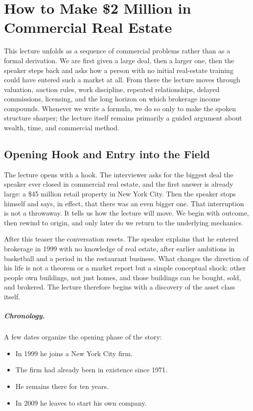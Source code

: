 \chapter{How to Make \$2 Million in Commercial Real Estate}

This lecture unfolds as a sequence of commercial problems rather than as a formal derivation. We are first given a large deal, then a larger one, then the speaker steps back and asks how a person with no initial real-estate training could have entered such a market at all. From there the lecture moves through valuation, auction rules, work discipline, repeated relationships, delayed commissions, licensing, and the long horizon on which brokerage income compounds. Whenever we write a formula, we do so only to make the spoken structure sharper; the lecture itself remains primarily a guided argument about wealth, time, and commercial method.

\section{Opening Hook and Entry into the Field}

The lecture opens with a hook. The interviewer asks for the biggest deal the speaker ever closed in commercial real estate, and the first answer is already large: a \$45 million retail property in New York City. Then the speaker stops himself and says, in effect, that there was an even bigger one. That interruption is not a throwaway. It tells us how the lecture will move. We begin with outcome, then rewind to origin, and only later do we return to the underlying mechanics.

After this teaser the conversation resets. The speaker explains that he entered brokerage in 1999 with no knowledge of real estate, after earlier ambitions in basketball and a period in the restaurant business. What changes the direction of his life is not a theorem or a market report but a simple conceptual shock: other people own buildings, not just homes, and those buildings can be bought, sold, and brokered. The lecture therefore begins with a discovery of the asset class itself.

\paragraph{Chronology.}
A few dates organize the opening phase of the story:
\begin{itemize}
\item In 1999 he joins a New York City firm.
\item The firm had already been in existence since 1971.
\item He remains there for ten years.
\item In 2009 he leaves to start his own company.
\end{itemize}

